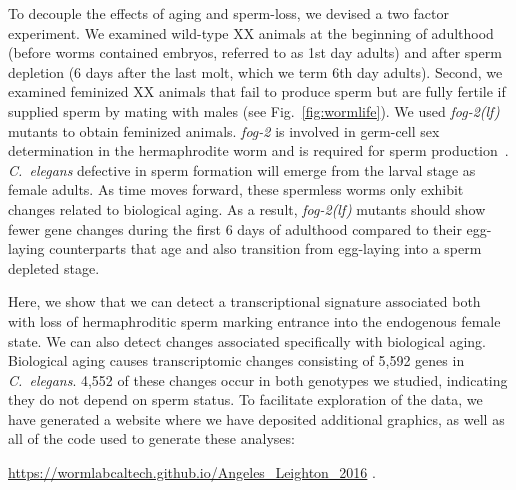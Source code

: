 \documentclass[9pt,twocolumn,twoside]{gsag3jnl}
\newcommand{\cel}{\emph{C.~elegans}}
\newcommand{\fog}{\emph{\mbox{fog-2(lf)}}}
\newcommand{\gene}[1]{\emph{\mbox{#1}}}
\newcommand{\agen}{5,592}
\newcommand{\website}{
            \url{https://wormlabcaltech.github.io/Angeles_Leighton_2016}
            }
\begin{document}
To decouple the effects of aging and sperm-loss, we devised a two factor
experiment. We examined wild-type XX animals at the beginning of
adulthood (before worms contained embryos, referred to as 1st day adults) and
after sperm depletion (6 days after the last molt, which we term 6th day
adults). Second, we examined feminized XX animals that fail to produce sperm but
are fully fertile if supplied sperm by mating with males (see
Fig.~\ref{fig:wormlife}). We used \fog{} mutants to obtain feminized animals.
\gene{fog-2} is involved in germ-cell sex determination in the hermaphrodite
worm and is required for sperm production~\citep{Schedl1988,Clifford2000}.
\cel{} defective in sperm formation will emerge from the larval stage as female
adults. As time moves forward, these spermless worms only exhibit
changes related to biological aging. As a result, \fog{} mutants should show
fewer gene changes during the first 6 days of adulthood compared to their
egg-laying counterparts that age and also transition from egg-laying into a
sperm depleted stage.

Here, we show that we can detect a transcriptional signature associated both
with loss of hermaphroditic sperm marking entrance into the endogenous female state.
We can also detect changes associated specifically with biological aging.
Biological aging causes transcriptomic changes consisting of \agen{} genes
in \cel{}. 4,552 of these changes occur in both genotypes we studied,
indicating they do not depend on sperm status. To facilitate
exploration of the data, we have generated a website where we have deposited
additional graphics, as well as all of the code used to generate these analyses:
\website{}.
\end{document}
